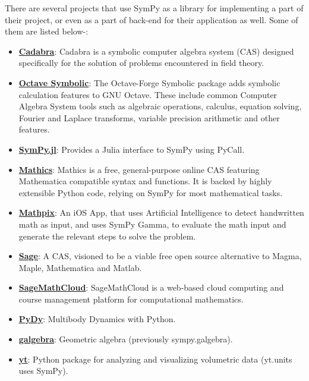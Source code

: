 There are several projects that use SymPy as a library for implementing
a part of their project, or even as a part of back-end for their
application as well.
\newline
Some of them are listed below-:

\begin{itemize}
\item
  \href{http://cadabra.science/index.html}{\textbf{Cadabra}}: Cadabra is
  a symbolic computer algebra system (CAS) designed specifically for the
  solution of problems encountered in field theory.
\item
  \href{http://octave.sourceforge.net/symbolic/}{\textbf{Octave Symbolic}}:
  The Octave-Forge Symbolic package adds symbolic calculation features
  to GNU Octave. These include common Computer Algebra System tools such
  as algebraic operations, calculus, equation solving, Fourier and
  Laplace transforms, variable precision arithmetic and other features.
\item
  \href{https://github.com/jverzani/SymPy.jl}{\textbf{SymPy.jl}}:
  Provides a Julia interface to SymPy using PyCall.
\item
  \href{https://mathics.github.io/}{\textbf{Mathics}}: Mathics is a
  free, general-purpose online CAS featuring Mathematica compatible
  syntax and functions. It is backed by highly extensible Python code,
  relying on SymPy for most mathematical tasks.
\item
  \href{http://mathpix.com/}{\textbf{Mathpix}}: An iOS App, that uses
  Artificial Intelligence to detect handwritten math as input, and uses
  SymPy Gamma, to evaluate the math input and generate the relevant
  steps to solve the problem.
\item
  \href{http://www.sagemath.org/}{\textbf{Sage}}: A CAS, visioned to be
  a viable free open source alternative to Magma, Maple, Mathematica and
  Matlab.
\item
  \href{https://cloud.sagemath.com}{\textbf{SageMathCloud}}:
  SageMathCloud is a web-based cloud computing and course management
  platform for computational mathematics.
\item
  \href{http://www.pydy.org/}{\textbf{PyDy}}: Multibody Dynamics with
  Python.
\item
  \href{https://github.com/brombo/galgebra}{\textbf{galgebra}}:
  Geometric algebra (previously sympy.galgebra).
\item
  \href{http://yt-project.org/}{\textbf{yt}}: Python package for
  analyzing and visualizing volumetric data (yt.units uses SymPy).

\end{itemize}
